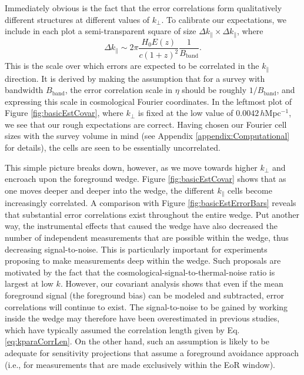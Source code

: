 \documentclass[twocolumn,aps,prd,nofootinbib,showpacs]{revtex4-1}
\begin{document}
Immediately obvious is the fact that the error correlations form qualitatively different structures at different values of $k_\perp$.  To calibrate our expectations, we include in each plot a semi-transparent square of size $\Delta k_\parallel \times \Delta k_\parallel$, where
\begin{equation}
\label{eq:kparaCorrLen}
\Delta k_\parallel \sim 2\pi \frac{ H_0 E(z)}{c (1+z)^2} \frac{1}{B_\textrm{band}}.
\end{equation}
This is the scale over which errors are expected to be correlated in the $k_\parallel$ direction.  It is derived by making the assumption that for a survey with bandwidth $B_\textrm{band}$, the error correlation scale in $\eta$ should be roughly $1/ B_\textrm{band}$, and expressing this scale in cosmological Fourier coordinates.  In the leftmost plot of Figure \ref{fig:basicEstCovar}, where $k_\perp$ is fixed at the low value of $0.0042\,h$Mpc$^{-1}$, we see that our rough expectations are correct.  Having chosen our Fourier cell sizes with the survey volume in mind (see Appendix \ref{appendix:Computational} for details), the cells are seen to be essentially uncorrelated.

This simple picture breaks down, however, as we move towards higher $k_\perp$ and encroach upon the foreground wedge.  Figure \ref{fig:basicEstCovar} shows that as one moves deeper and deeper into the wedge, the different $k_\parallel$ cells become increasingly correlated.  A comparison with Figure \ref{fig:basicEstErrorBars} reveals that substantial error correlations exist throughout the entire wedge.  Put another way, the instrumental effects that caused the wedge have also decreased the number of independent measurements that are possible within the wedge, thus decreasing signal-to-noise.  This is particularly important for experiments proposing to make measurements deep within the wedge.  Such proposals are motivated by the fact that the cosmological-signal-to-thermal-noise ratio is largest at low $k$.  However, our covariant analysis shows that even if the mean foreground signal (the foreground bias) can be modeled and subtracted, error correlations will continue to exist.  The signal-to-noise to be gained by working inside the wedge may therefore have been overestimated in previous studies, which have typically assumed the correlation length given by  Eq. \eqref{eq:kparaCorrLen}.  On the other hand, such an assumption is likely to be adequate for sensitivity projections that assume a foreground avoidance approach (i.e., for measurements that are made exclusively within the EoR window).
\end{document}
